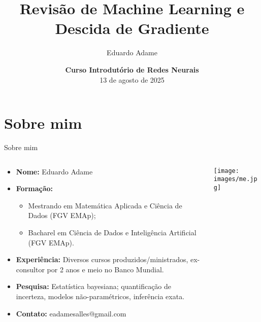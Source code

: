 \documentclass[xcolor=dvipsnames,t,aspectratio=169]{beamer} %
\title{Revisão de Machine Learning e Descida de Gradiente}
\author{
    Eduardo Adame
}
\date{{\color{nes_dark_purple}  \textbf{Curso Introdutório de Redes Neurais}\\[0.5em] 13 de agosto de 2025 }}
\begin{document}
\frame[plain]{\titlepage}
\setcounter{framenumber}{0}


\section{Sobre mim}
\begin{frame}[c]{Sobre mim}
    \begin{columns}[c]
        \begin{column}{0.7\textwidth}
            \begin{itemize}
                \item \textbf{Nome:} Eduardo Adame
                \item \textbf{Formação:}
                \begin{itemize}
                    \item Mestrando em Matemática Aplicada e Ciência de Dados (FGV EMAp); 
                    \item Bacharel em Ciência de Dados e Inteligência Artificial (FGV EMAp).
                \end{itemize}
                \item \textbf{Experiência:} Diversos cursos produzidos/ministrados, ex-consultor por 2 anos e meio no Banco Mundial.
                \item \textbf{Pesquisa:} Estatística bayesiana; quantificação de incerteza, modelos não-paramétricos, inferência exata.
                \item \textbf{Contato:} eadamesalles@gmail.com
            \end{itemize}
        \end{column}
        \begin{column}{0.3\textwidth}
            \centering
            \texttt{[image: images/me.jpg]}
        \end{column}
    \end{columns}
\end{frame}
\end{document}
